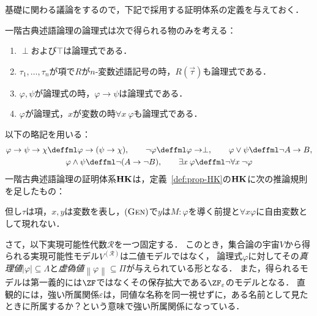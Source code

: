\documentclass[realisability.tex]{subfiles}
\begin{document}
基礎に関わる議論をするので，下記で採用する証明体系の定義を与えておく．
\begin{definition}
 一階古典述語論理の論理式は次で得られる物のみを考える：
 \begin{enumerate}[series=fml-def]
  \item $\perp$および$\top$は論理式である．
  \item $\tau_1, \dots, \tau_n$が項で$R$が$n$-変数述語記号の時，$R(\vec{\tau})$も論理式である．
  \item $\varphi, \psi$が論理式の時，$\varphi \to \psi$は論理式である．
  \item $\varphi$が論理式，$x$が変数の時$\forall x\: \varphi$も論理式である．
 \end{enumerate}
 以下の略記を用いる：
 \begin{gather*}
  \varphi \to \psi \to \chi \deffml \varphi \to (\psi \to \chi),\qquad
  \neg \varphi \deffml \varphi \to \perp,\qquad
  \varphi \lor \psi \deffml \neg A \to B,\\
  \varphi \land \psi \deffml \neg (A \to \neg B),\qquad
  \exists x \: \varphi \deffml \neg \forall x\: \neg \varphi
 \end{gather*}
 一階古典述語論理の証明体系$\mathord{\mathbf{HK}}$は，定義~\ref{def:prop-HK}の$\mathord{\mathbf{HK}}$に次の推論規則を足したもの：
 \begin{center}
 \end{center} 
 但し$\tau$は項，$x, y$は変数を表し，$(\mathord{\textsc{Gen}})$で$y$は$M: \varphi$を導く前提と$\forall x \varphi$に自由変数として現れない．
\end{definition}
さて，以下実現可能性代数$\mathcal{R}$を一つ固定する．
このとき，集合論の宇宙$V$から得られる実現可能性モデル$V^{(\mathcal{R})}$は二値モデルではなく，
論理式$\varphi$に対してその\emph{真理値}$|\varphi| \subseteq \Lambda$と\emph{虚偽値}$\left\|\varphi\right\| \subseteq \Pi$が与えられている形となる．
また，得られるモデルは第一義的には$\ZF$ではなくその保存拡大である$\ZF_\varepsilon$のモデルとなる．
直観的には，強い所属関係$\varepsilon$は，同値な名称を同一視せずに，ある名前として見たときに所属するか？という意味で強い所属関係になっている．
\end{document}
